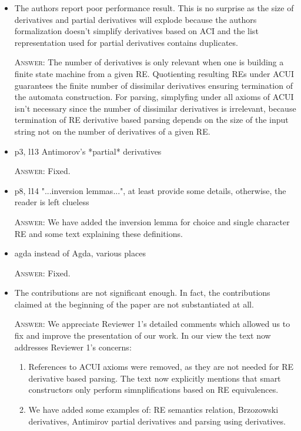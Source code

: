 \documentclass{article}
\begin{document}
\begin{itemize}
        
    \item The authors report poor performance result. This is no surprise as the size of derivatives and partial derivatives
          will explode because the authors formalization doesn't simplify derivatives based on ACI
          and the list representation used for partial derivatives contains duplicates.
    
    \textsc{Answer}: The number of derivatives is only relevant when one is building a finite state machine from a given RE.
    Quotienting resulting REs under ACUI guarantees the finite number of dissimilar derivatives ensuring termination
    of the automata construction. For parsing, simplyfing under all axioms of ACUI isn't necessary since the number
    of dissimilar derivatives is irrelevant, because termination of RE derivative based parsing depends on the 
    size of the input string not on the number of derivatives of a given RE.      

    \item p3, l13     Antimorov's *partial* derivatives
    
    \textsc{Answer}: Fixed.
    
    \item p8, l14    "...inversion lemmas...", at least provide some details, otherwise, the reader is left clueless
    
    \textsc{Answer:} We have added the inversion lemma for choice and single character RE and some text explaining these definitions.
    
    \item agda instead of Agda, various places
 
    \textsc{Answer}: Fixed. 
    
    \item The contributions are not significant enough. In fact, the contributions claimed
          at the beginning of the paper are not substantiated at all.
          
    \textsc{Answer}: We appreciate Reviewer 1's detailed comments which allowed us to fix and improve the presentation of our work. 
     In our view the text now addresses Reviewer 1's concerns:
     \begin{enumerate}
         \item References to ACUI axioms were removed, as they are not needed for
RE derivative based parsing. The text now explicitly mentions that
smart constructors only perform simnplifications based on RE
equivalences.
         \item We have added some examples of: RE semantics relation, Brzozowski derivatives, Antimirov partial derivatives 
               and parsing using derivatives. 
     \end{enumerate}
     

\end{itemize}
\end{document}

